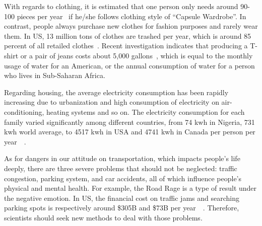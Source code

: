 \documentclass[letterpaper, twocolumn, 10pt, conference]{IEEEtran}
\begin{document}
With regards to clothing, it is estimated that one person only needs around 90-100 pieces per year~\cite{Courtney2011Wardrobe} if he/she follows clothing style of \enquote{Capsule Wardrobe}. 
In contrast, people always purchase new clothes for fashion purposes and rarely wear them. In US, 13 million tons of clothes are trashed per year, which is around 85 percent of all retailed clothes~\cite{cloth-waste}.
Recent investigation indicates that producing a T-shirt or a pair of jeans costs about 5,000 gallons~\cite{Glynis2015Dirtiest}, which is equal to the monthly usage of water for an American, or the annual consumption of water for a person who lives in Sub-Saharan Africa.


Regarding housing, the average electricity consumption has been rapidly increasing due to urbanization and high consumption of electricity on air-conditioning, heating systems and so on. The electricity consumption for each family varied significantly among different countries, from 74 kwh in Nigeria, 731 kwh world average, to 4517 kwh in USA and 4741 kwh in Canada per person per year~\cite{avg-household-electricity}~\cite{gifford2012residential}. %
 

As for dangers in our attitude on transportation, which impacts people's life deeply, there are three severe problems that should not be neglected: traffic congestion, parking system, and car accidents, all of which influence people's physical and mental health. For example, the Road Rage is a type of result under the negative emotion. In US, the financial cost on traffic jams and searching parking spots is respectively around \$305B and \$73B per year~\cite{traffic-cost2017}~\cite{parking-cost}. Therefore, scientists should seek new methods to deal with those problems.
\end{document}
